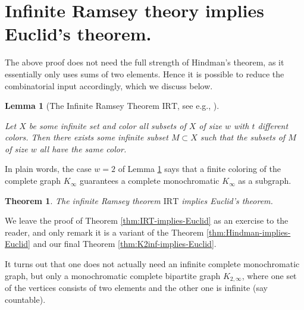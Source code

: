 \documentclass{article}
\theoremstyle{theorem}
\newtheorem{theorem}{Theorem}
\newtheorem{lemma}{Lemma}
\theoremstyle{definition}
\newcommand{\IRT}{\mathrm{IRT}}
\begin{document}
\section{Infinite Ramsey theory implies Euclid's theorem.}
{\label{sec:IRT}}
The above proof does not need the full strength of Hindman's theorem, as
it essentially only uses sums of two elements.
Hence it is possible to reduce the combinatorial input accordingly, which we
discuss below.
\begin{lemma}[The Infinite Ramsey Theorem $\IRT$, see 
e.g., {\cite[Theorem 9.1.2]{Diestel}}]\label{lemma:IRT}

Let $X$ be some infinite set and color all subsets of $X$ of size $w$
with $t$ different colors. Then there exists some infinite subset
$M\subset X$ such that the subsets of $M$ of size $w$ all have the same color.
\end{lemma}
In plain words, the case $w=2$ of Lemma \ref{lemma:IRT}
says that a finite coloring of the complete
graph $K_{\infty}$ guarantees a complete monochromatic $K_{\infty}$ as a
subgraph.
\begin{theorem}{\label{thm:IRT-implies-Euclid}}
The infinite Ramsey theorem $\IRT$ implies Euclid's theorem.
\end{theorem}
We leave the proof of Theorem \ref{thm:IRT-implies-Euclid}
as an exercise to the reader, and only
remark it is a variant of the Theorem
{\ref{thm:Hindman-implies-Euclid}} and our final Theorem
{\ref{thm:K2inf-implies-Euclid}}.

It turns out that one does not actually need an
infinite complete monochromatic graph, but only
a monochromatic complete bipartite graph $K_{2, \infty}$,
where one set of the vertices 
consists of two elements and the other one is infinite (say countable).
\end{document}
